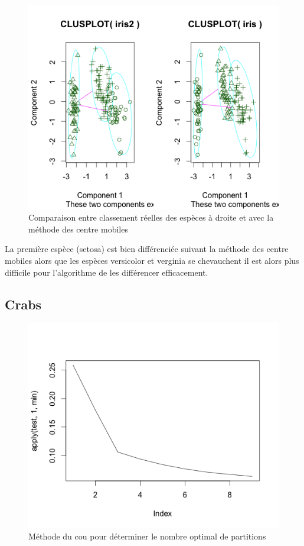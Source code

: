 \documentclass{article}\usepackage[]{graphicx}\usepackage[]{color}
\begin{document}
\begin{figure}
\includegraphics[width=\textwidth]{ex2_iris_4.png}
\caption{Comparaison entre classement réelles des espèces à droite et avec la méthode des centre mobiles}
\end{figure}

La première espèce (setosa) est bien différenciée suivant la méthode des centre mobiles alors que les espèces versicolor et verginia se chevauchent il est alors plus difficile pour l'algorithme de les différencer efficacement. 

\subsection*{Crabs}

\begin{figure}
\includegraphics[width=\textwidth]{ex2_crab_1.png}
\caption{Méthode du cou pour déterminer le nombre optimal de partitions}
\end{figure}
\end{document}
